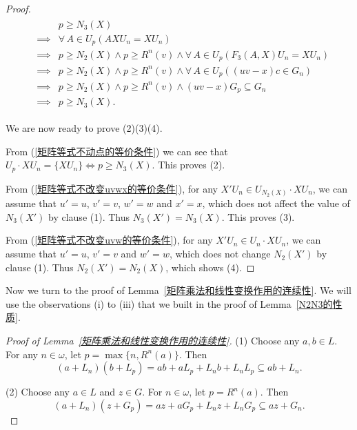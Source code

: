\documentclass[11pt]{amsart}
\newtheorem{lemma}[theorem]{Lemma}
\theoremstyle{definition}
\theoremstyle{remark}
\numberwithin{equation}{section}
\def\lh{{\mathrm{lh}}}
\begin{document}
\begin{proof}
\begin{align}
        &\begin{aligned}
            &p\geq N_3(X)\\
            \implies&\forall\,A\in U_p\left(AXU_n=XU_n\right)\\
            \implies&p\geq N_2(X)\land p\geq R^n(v)\land\forall\,A\in U_p\left(F_3(A,X)U_n=XU_n\right)\\
            \implies&p\geq N_2(X)\land p\geq R^n(v)\land\forall\,A\in U_p\left((uv-x)c\in G_n\right)\\
            \implies&p\geq N_2(X)\land p\geq R^n(v)\land (uv-x)G_p\subseteq G_n\\
            \implies&p\geq N_3(X).
        \end{aligned}\label{矩阵等式不动点的等价条件}
    \end{align}

    We are now ready to prove (2)(3)(4).

    From (\ref{矩阵等式不动点的等价条件}) we can see that $U_p\cdot XU_n=\{XU_n\}\iff p\geq N_3(X)$. This proves (2).

    From (\ref{矩阵等式不改变uvwx的等价条件}), for any $X'U_n\in U_{N_2(X)}\cdot XU_n$, we can assume that $u'=u$, $v'=v$, $w'=w$ and $x'=x$, which does not affect the value of $N_3(X')$ by clause (1). Thus $N_3(X')=N_3(X)$. This proves (3).

    From (\ref{矩阵等式不改变uvw的等价条件}), for any $X'U_n\in U_n\cdot XU_n$, we can assume that $u'=u$, $v'=v$ and $w'=w$, which does not change $N_2(X')$ by clause (1). Thus $N_2(X')=N_2(X)$, which shows (4).
\end{proof}

Now we turn to the proof of Lemma~\ref{矩阵乘法和线性变换作用的连续性}. We will use the observations (i) to (iii) that we built in the proof of Lemma~\ref{N2N3的性质}.
\begin{proof}[Proof of Lemma~\ref{矩阵乘法和线性变换作用的连续性}]
    (1) Choose any $a,b\in L$. For any $n\in\omega$, let $p=\max\{n,R^n(a)\}$. Then
    $$(a+L_n)(b+L_p)=ab+aL_p+L_nb+L_nL_p\subseteq ab+L_n.$$

    (2) Choose any $a\in L$ and $z\in G$. For $n\in\omega$, let $p=R^n(a)$. Then
    $$(a+L_n)(z+G_p)=az+aG_p+L_nz+L_nG_p\subseteq az+G_n.$$
\end{proof}

\end{document}
